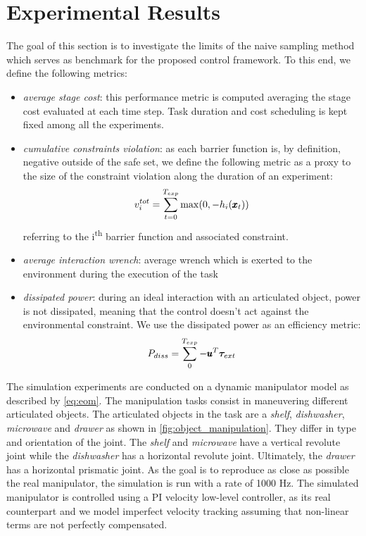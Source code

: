 \section{Experimental Results} \label{sec:experiments}

The goal of this section is to investigate the limits of the naive sampling method which serves as benchmark for the proposed control framework. To this end, we define the following metrics:
\begin{itemize}
    \item \textit{average stage cost}: this performance metric is computed averaging the stage cost evaluated at each time step. Task duration and cost scheduling is kept fixed among all the experiments.  
    \item \textit{cumulative constraints violation}: as each barrier function is, by definition, negative outside of the safe set, we define the following metric as a proxy to the size of the constraint violation along the duration of an experiment:
    \begin{equation*}
        v^{tot}_i = \sum\limits_{t=0}^{T_{exp}} \max(0, -h_i(\pmb{x}_t))
    \end{equation*}
    referring to the i\textsuperscript{th} barrier function and associated constraint.
    \item \textit{average interaction wrench}: average wrench which is exerted to the environment during the execution of the task
    \item \textit{dissipated power}: during an ideal interaction with an articulated object, power is not dissipated, meaning that the control doesn't act against the environmental constraint. We use the dissipated power as an efficiency metric:
    \begin{equation}
        P_{diss} = \sum\limits_{0}^{T_{exp}} -\pmb{u}^T \boldsymbol{\tau}_{ext}
    \end{equation}
\end{itemize}
The simulation experiments are conducted on a dynamic manipulator model as described by \eqref{eq:eom}. The manipulation tasks consist in maneuvering different articulated objects. The articulated objects in the task are a \textit{shelf}, \textit{dishwasher}, \textit{microwave} and \textit{drawer} as shown in \fig\ref{fig:object_manipulation}. They differ in type and orientation of the joint. The \textit{shelf} and \textit{microwave} have a vertical revolute joint while the \textit{dishwasher} has a horizontal revolute joint. Ultimately, the \textit{drawer} has a horizontal prismatic joint. As the goal is to reproduce as close as possible the real manipulator, the simulation is run with a rate of 1000 Hz. The simulated manipulator is controlled using a PI velocity low-level controller, as its real counterpart and we model imperfect velocity tracking assuming that non-linear terms are not perfectly compensated. 
  
